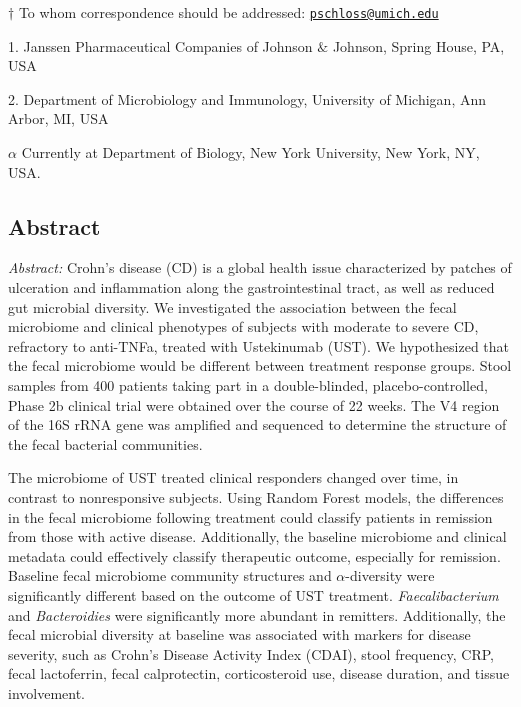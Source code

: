 \documentclass[11pt,]{article}
\begin{document}
\(\dagger\) To whom correspondence should be addressed:
\href{mailto:pschloss@umich.edu}{\nolinkurl{pschloss@umich.edu}}

1. Janssen Pharmaceutical Companies of Johnson \({\&}\) Johnson, Spring
House, PA, USA

2. Department of Microbiology and Immunology, University of Michigan,
Ann Arbor, MI, USA

\({\alpha}\) Currently at Department of Biology, New York University,
New York, NY, USA.

\newpage

\subsection{Abstract}\label{abstract}

\emph{Abstract:} Crohn's disease (CD) is a global health issue
characterized by patches of ulceration and inflammation along the
gastrointestinal tract, as well as reduced gut microbial diversity. We
investigated the association between the fecal microbiome and clinical
phenotypes of subjects with moderate to severe CD, refractory to
anti-TNFa, treated with Ustekinumab (UST). We hypothesized that the
fecal microbiome would be different between treatment response groups.
Stool samples from 400 patients taking part in a double-blinded,
placebo-controlled, Phase 2b clinical trial were obtained over the
course of 22 weeks. The V4 region of the 16S rRNA gene was amplified and
sequenced to determine the structure of the fecal bacterial communities.

The microbiome of UST treated clinical responders changed over time, in
contrast to nonresponsive subjects. Using Random Forest models, the
differences in the fecal microbiome following treatment could classify
patients in remission from those with active disease. Additionally, the
baseline microbiome and clinical metadata could effectively classify
therapeutic outcome, especially for remission. Baseline fecal microbiome
community structures and \({\alpha}\)-diversity were significantly
different based on the outcome of UST treatment. \emph{Faecalibacterium}
and \emph{Bacteroidies} were significantly more abundant in remitters.
Additionally, the fecal microbial diversity at baseline was associated
with markers for disease severity, such as Crohn's Disease Activity
Index (CDAI), stool frequency, CRP, fecal lactoferrin, fecal
calprotectin, corticosteroid use, disease duration, and tissue
involvement.
\end{document}
